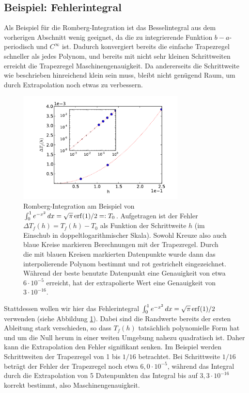 
\afterpage{\clearpage}
  
\subsection{Beispiel: Fehlerintegral}

Als Beispiel für die Romberg-Integration ist das Besselintegral aus
dem vorherigen Abschnitt wenig geeignet, da die zu integrierende
Funktion $b-a$-periodisch und $C^\infty$ ist. Dadurch konvergiert
bereits die einfache Trapezregel schneller als jedes Polynom, und
bereits mit nicht sehr kleinen Schrittweiten erreicht die Trapezregel
Maschinengenauigkeit. Da andererseits die Schrittweite wie beschrieben
hinreichend klein sein muss, bleibt nicht genügend Raum, um durch
Extrapolation noch etwas zu verbessern. 

\begin{figure}
  \centering
  \includegraphics[width=0.75\textwidth]{plots/romberg}
  \caption{Romberg-Integration am Beispiel von $\int_0^1 e^{-x^2}\,dx
    = \sqrt{\pi}\operatorname{erf}(1)/2 =: T_0$. Aufgetragen ist der Fehler $\Delta
    T_f(h) = T_f(h) - T_0$ als Funktion der Schrittweite $h$ (im Einschub
    in doppeltlogarithmischer Skala). Sowohl Kreuze also auch blaue
    Kreise markieren Berechnungen mit der Trapezregel. Durch die mit
    blauen Kreisen markierten Datenpunkte wurde dann das
    interpolierende Polynom bestimmt und rot gestrichelt
    eingezeichnet. Während der beste benutzte Datenpunkt eine
    Genauigkeit von etwa $6\cdot10^{-5}$ erreicht, hat der
    extrapolierte Wert eine Genauigkeit von $3\cdot 10^{-16}$.  }
  \label{fig:romberg}
\end{figure}

Stattdessen wollen wir hier das Fehlerintegral $\int_0^1 e^{-x^2}\,dx
= \sqrt{\pi}\operatorname{erf}(1)/2$ verwenden (siehe Abbildung \ref{fig:romberg}).
Dabei sind die Randwerte bereits der ersten Ableitung stark
verschieden, so dass $T_f(h)$ tatsächlich polynomielle Form hat und um
die Null herum in einer weiten Umgebung nahezu quadratisch ist. Daher
kann die Extrapolation den Fehler signifikant senken.  Im Beispiel
werden Schrittweiten der Trapezregel von 1 bis $1/16$ betrachtet. Bei
Schrittweite $1/16$ beträgt der Fehler der Trapezregel noch etwa
$6,0\cdot 10^{-5}$, während das Integral durch die Extrapolation von 5
Datenpunkten das Integral bis auf $3,3\cdot 10^{-16}$ korrekt
bestimmt, also Maschinengenauigkeit.

